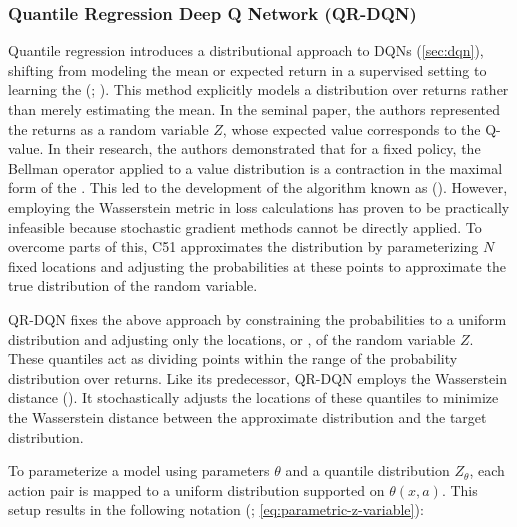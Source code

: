         \subsubsection{Quantile Regression Deep Q Network (QR-DQN)}
        \label{sec:qrdqn}
        
            \noindent Quantile regression introduces a distributional approach to DQNs (\autoref{sec:dqn}), shifting from modeling the mean or expected return in a supervised setting to learning the  (\textcolor{deepblue}{\cite{dabney2017distributional}; \cite{stable-baselines3}}). This method explicitly models a distribution over returns rather than merely estimating the mean. In the seminal paper, the authors represented the returns as a random variable $Z$, whose expected value corresponds to the Q-value. In their research, the authors demonstrated that for a fixed policy, the Bellman operator applied to a value distribution is a contraction in the maximal form of the . This led to the development of the algorithm known as  (\textcolor{deepblue}{\cite{bellemare2017distributional}}). However, employing the Wasserstein metric in loss calculations has proven to be practically infeasible because stochastic gradient methods cannot be directly applied. To overcome parts of this, C51 approximates the distribution by parameterizing $N$ fixed locations and adjusting the probabilities at these points to approximate the true distribution of the random variable. 
            
            \bigskip
            
            
            \noindent QR-DQN fixes the above approach by constraining the probabilities to a uniform distribution and adjusting only the locations, or , of the random variable $Z$. These quantiles act as dividing points within the range of the probability distribution over returns. Like its predecessor, QR-DQN employs the Wasserstein distance (\textcolor{deepblue}{\cite{dabney2017distributional}}). It stochastically adjusts the locations of these quantiles to minimize the Wasserstein distance between the approximate distribution and the target distribution.
            
            \bigskip
            
            \noindent To parameterize a model using parameters $\theta$ and a quantile distribution $Z_\theta$, each action pair is mapped to a uniform distribution supported on ${\theta(x,a)}$. This setup results in the following notation (\textcolor{deepblue}{\cite{dabney2017distributional}; \autoref{eq:parametric-z-variable}}):
            
